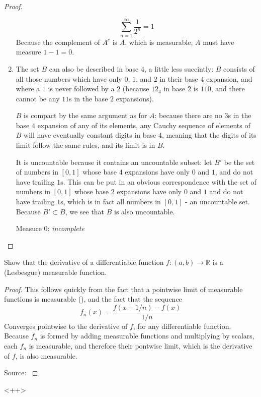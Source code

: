 \documentclass[12pt]{article}
\newcommand{\R}{\mathbb{R}}
\theoremstyle{definition}
\newenvironment{problem}[2][Problem]{\begin{trivlist}
\item[\hskip \labelsep {\bfseries #1}\hskip \labelsep {\bfseries #2.}]}{\end{trivlist}}
\begin{document}
\begin{problem}{4}
\begin{proof}
\begin{enumerate}[label=(\roman*)]
			\[\sum_{n=1}^\infty \frac{1}{2^n} = 1\]
			Because the complement of $A^c$ is $A$, which is measurable, $A$ must have measure $1-1 = 0$.
		\item The set $B$ can also be described in base $4$, a little less succintly: $B$ consists of all those numbers which have only $0$, $1$, and $2$ in their base $4$ expansion, and where a $1$ is never followed by a $2$ (because $12_4$ in base 2 is $110$, and there cannot be any $11$s in the base $2$ expansions). 
			\par $B$ is compact by the same argument as for $A$: because there are no $3$s in the base $4$ expansion of any of its elements, any Cauchy sequence of elements of $B$ will have eventually constant digits in base $4$, meaning that the digits of its limit follow the same rules, and its limit is in $B$. 
			\par It is uncountable because it contains an uncountable subset: let $B'$ be the set of numbers in $[0,1]$ whose base $4$ expansions have only $0$ and $1$, and do not have trailing $1$s. This can be put in an obvious correspondence with the set of numbers in $[0,1]$ whose base $2$ expansions have only $0$ and $1$ and do not have trailing $1$s, which is in fact all numbers in $[0,1]$ - an uncountable set. Because $B' \subset B$, we see that $B$ is also uncountable.
			\par Measure $0$: \textit{incomplete}
		\end{enumerate}
	\end{proof}

\end{problem}
\begin{problem}{5}
	Show that the derivative of a differentiable function $f: (a, b)\to \R$ is a (Lesbesgue) measurable function.
	\begin{proof}
		This follows quickly from the fact that a pointwise limit of measurable functions is measurable (\cite{rudin}), and the fact that the sequence
		\[f_n(x) = \frac{f(x + 1/n) - f(x)}{1/n}\]
		Converges pointwise to the derivative of $f$, for any differentiable function. Because $f_n$ is formed by adding measurable functions and multiplying by scalars, each $f_n$ is measurable, and therefore their pontwise limit, which is the derivative of $f$, is also measurable.
		\par Source: \cite{se}
	\end{proof}
\end{problem}
\begin{thebibliography}{}
\end{thebibliography}<++>
\end{document}
